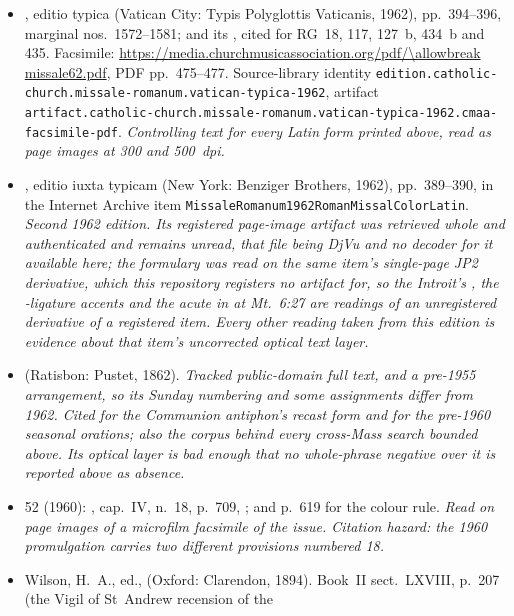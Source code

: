 \begin{itemize}[leftmargin=1.2em, itemsep=0.15em]
\item {}, editio typica (Vatican City: Typis Polyglottis
Vaticanis, 1962), pp.~394--396, marginal nos.\ 1572--1581; and its
, cited for RG~18, 117, 127~b, 434~b and 435.
Facsimile: \url{https://media.churchmusicassociation.org/pdf/\allowbreak missale62.pdf},
PDF pp.~475--477. Source-library identity
\texttt{edition.catholic-church.missale-\allowbreak romanum.vatican-typica-1962},
artifact
\texttt{artifact.catholic-church.missale-\allowbreak romanum.vatican-typica-1962.cmaa-facsimile-pdf}.
\textit{Controlling text for every Latin form printed above, read as page
images at 300 and 500~dpi.}
\item {}, editio iuxta typicam (New York: Benziger
Brothers, 1962), pp.~389--390, in the Internet Archive item
\texttt{MissaleRomanum1962RomanMissalColorLatin}. \textit{Second 1962 edition.
Its registered page-image artifact was retrieved whole and authenticated and
remains unread, that file being DjVu and no decoder for it available here; the
formulary was read on the same item's single-page JP2 derivative, which this
repository registers no artifact for, so the Introit's , the
-ligature accents and the acute in  at Mt.\ 6:27 are
readings of an unregistered derivative of a registered item. Every other reading
taken from this edition is evidence about that item's uncorrected optical text
layer.}
\item {} (Ratisbon: Pustet, 1862). \textit{Tracked
public-domain full text, and a pre-1955 arrangement, so its Sunday numbering
and some assignments differ from 1962. Cited for the Communion antiphon's
recast form and for the pre-1960 seasonal orations; also the corpus behind
every cross-Mass search bounded above. Its optical layer is bad enough that no
whole-phrase negative over it is reported above as absence.}
\item {} 52 (1960): , cap.~IV, n.~18, p.~709, ; and p.~619 for the colour rule. \textit{Read on page
images of a microfilm facsimile of the issue. Citation hazard: the 1960 promulgation carries two different provisions
numbered 18.}
\item Wilson, H.~A., ed.,  (Oxford: Clarendon,
1894). Book~II sect.~LXVIII, p.~207 (the Vigil of St~Andrew recension of the

\end{itemize}
